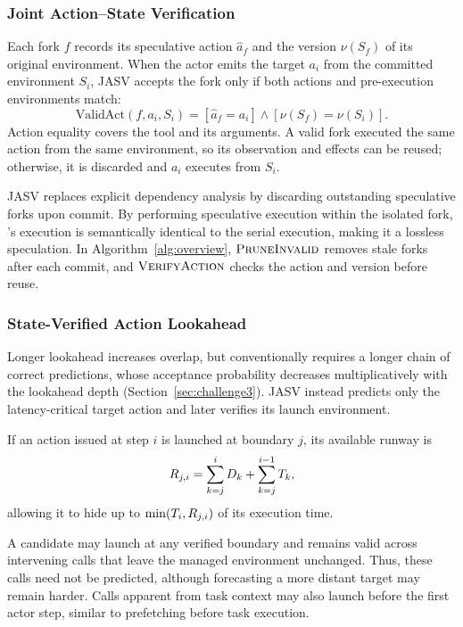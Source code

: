 \subsubsection{Joint Action--State Verification}
\label{subsec:action-verification}
Each fork $f$ records its speculative action $\hat a_f$ and the version $\nu(S_f)$ of its
original environment. When the actor emits the target $a_i$ from the committed environment $S_i$,
JASV accepts the fork only if both actions and pre-execution environments match:
\begin{equation}
\mathrm{ValidAct}(f,a_i,S_i)
=
[\hat a_f=a_i]
\land
[\nu(S_f)=\nu(S_i)].
\end{equation}
Action equality covers the tool and its arguments. A valid fork executed the same action
from the same environment, so its observation and effects can be reused; otherwise, it
is discarded and $a_i$ executes from $S_i$.

JASV replaces explicit dependency analysis by discarding outstanding speculative forks upon commit. By performing speculative execution within the isolated fork, \sysname{}'s execution is semantically identical to the serial execution, making it a lossless speculation.
In Algorithm~\ref{alg:overview}, $\textsc{PruneInvalid}$ removes stale forks after each
commit, and $\textsc{VerifyAction}$ checks the action and version before reuse.

\subsubsection{State-Verified Action Lookahead}
\label{subsec:action-lookahead}

Longer lookahead increases overlap, but conventionally requires a longer chain of correct
predictions, whose acceptance probability decreases multiplicatively with the lookahead depth
(Section~\ref{sec:challenge3}). JASV instead predicts only the latency-critical target
action and later verifies its launch environment.

If an action issued at step $i$ is launched at boundary $j$, its available runway is
\begin{equation}
R_{j,i}
=
\sum_{k=j}^{i}D_k
+
\sum_{k=j}^{i-1}T_k,
\end{equation}
allowing it to hide up to $\min(T_i,R_{j,i})$ of its execution time.

A candidate may launch at any verified boundary and remains valid across intervening
calls that leave the managed environment unchanged. Thus, these calls need not be
predicted, although forecasting a more distant target may remain harder. Calls apparent
from task context may also launch before the first actor step, similar to prefetching
before task execution.

